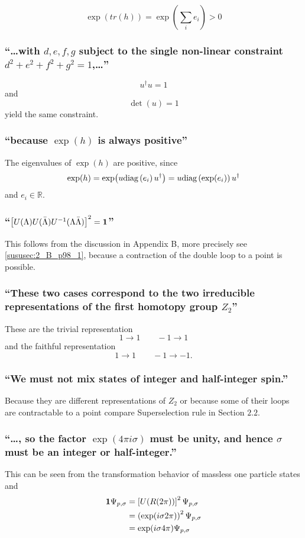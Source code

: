 \[\exp(tr(h))=\exp(\sum\limits_{i}e_i)>0\]

\subsubsection{\enquote{\dots with $d,e,f,g$ subject to the single non-linear constraint $d^2+e^2+f^2+g^2=1$,\dots} }
\[u^\dagger u=1\] and \[\det(u)=1\] yield the same constraint.

\subsubsection{\enquote{because $\exp(h)$ is always positive} }
The eigenvalues of $\exp(h)$ are positive, since
\[\exp(h)=\exp(u \text{diag}\left({e_i}\right) u^\dagger)=u \text{diag}\left({\exp(e_i)}\right) u^\dagger\]
and $e_i \in \mathbb{R}$.

\subsubsection{\enquote{$\left[U(\Lambda)U(\bar{\Lambda})U^{-1}(\Lambda\bar{\Lambda})\right]^2=\mathbf{1}$} }
This follows from the discussion in Appendix B, more precisely see \ref{sususec:2_B_p98_1}, because a contraction of the double loop to a point is possible.

\subsubsection{\enquote{These two cases correspond to the two irreducible representations of the first homotopy group $Z_2$} }
These are the trivial representation \[1\rightarrow1\qquad-1\rightarrow1\] and the faithful representation \[1\rightarrow1\qquad-1\rightarrow-1.\]

\subsubsection{\enquote{We must not mix states of integer and half-integer spin.} }
Because they are different representations of $Z_2$ or because some of their loops are contractable to a point compare Superselection rule in Section $2.2$.
\todo

\subsubsection{\enquote{\dots , so the factor $\exp(4\pi i \sigma)$ must be \textbf{unity}, and hence $\sigma$ must be an integer or half-integer.} }
This can be seen from the transformation behavior of massless one particle states  and 
\begin{align*}
	\mathbf{1} \Psi_{p,\sigma} &=\left[U(R(2\pi))\right]^2 \Psi_{p,\sigma}\\
	&=\left(\exp(i\sigma 2\pi)\right)^2\Psi_{p,\sigma}\\
	&=\exp(i\sigma 4\pi)\Psi_{p,\sigma}
\end{align*}\todo %

